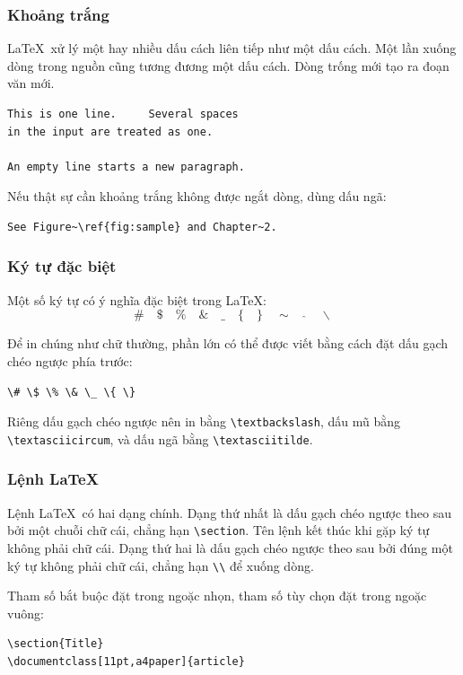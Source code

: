 \documentclass[11pt]{article}
\newcommand{\cmd}[1]{\texttt{\textbackslash #1}}
\begin{document}
\subsubsection{Khoảng trắng}

\LaTeX\ xử lý một hay nhiều dấu cách liên tiếp như một dấu cách. Một lần xuống
dòng trong nguồn cũng tương đương một dấu cách. Dòng trống mới tạo ra đoạn văn
mới.

\begin{verbatim}
This is one line.     Several spaces
in the input are treated as one.

An empty line starts a new paragraph.
\end{verbatim}

Nếu thật sự cần khoảng trắng không được ngắt dòng, dùng dấu ngã:
\begin{verbatim}
See Figure~\ref{fig:sample} and Chapter~2.
\end{verbatim}

\subsubsection{Ký tự đặc biệt}

Một số ký tự có ý nghĩa đặc biệt trong \LaTeX:
\[
\#\quad \$\quad \%\quad \&\quad \_\quad \{\quad \}\quad \sim\quad
\hat{\ }\quad \backslash
\]

Để in chúng như chữ thường, phần lớn có thể được viết bằng cách đặt dấu gạch
chéo ngược phía trước:
\begin{verbatim}
\# \$ \% \& \_ \{ \}
\end{verbatim}
Riêng dấu gạch chéo ngược nên in bằng \cmd{textbackslash}, dấu mũ bằng
\cmd{textasciicircum}, và dấu ngã bằng \cmd{textasciitilde}.

\subsubsection{Lệnh \LaTeX}

Lệnh \LaTeX\ có hai dạng chính. Dạng thứ nhất là dấu gạch chéo ngược theo sau
bởi một chuỗi chữ cái, chẳng hạn \cmd{section}. Tên lệnh kết thúc khi gặp ký tự
không phải chữ cái. Dạng thứ hai là dấu gạch chéo ngược theo sau bởi đúng một
ký tự không phải chữ cái, chẳng hạn \verb|\\| để xuống dòng.

Tham số bắt buộc đặt trong ngoặc nhọn, tham số tùy chọn đặt trong ngoặc vuông:
\begin{verbatim}
\section{Title}
\documentclass[11pt,a4paper]{article}
\end{verbatim}
\end{document}
